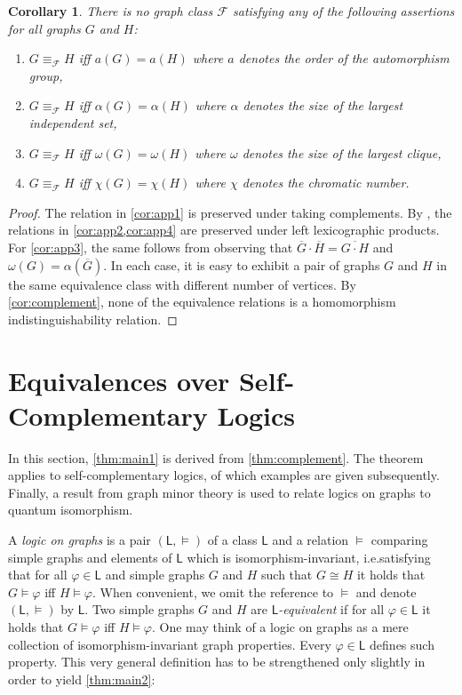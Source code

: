\documentclass[3p,final]{elsarticle}
\renewcommand\phi\varphi
\newtheorem{corollary}[theorem]{Corollary}
\begin{document}
	\begin{corollary} \label{cor:no-hom}
		There is no graph class $\mathcal{F}$ satisfying any of the following assertions for all graphs $G$ and $H$:
		\begin{enumerate}
			\item $G \equiv_{\mathcal{F}} H$ iff $a(G) = a(H)$ where $a$ denotes the order of the automorphism group,\label{cor:app1}
			\item $G \equiv_{\mathcal{F}} H$ iff $\alpha(G) = \alpha(H)$ where $\alpha$ denotes the size of the largest independent set,\label{cor:app2}
			\item $G \equiv_{\mathcal{F}} H$ iff $\omega(G) = \omega(H)$ where $\omega$ denotes the size of the largest clique,\label{cor:app3}
			\item $G \equiv_{\mathcal{F}} H$ iff $\chi(G) = \chi(H)$ where $\chi$ denotes the chromatic number.\label{cor:app4}
		\end{enumerate}
	\end{corollary}
	\begin{proof}
		The relation in \cref{cor:app1} is preserved under taking complements. By \cite[Theorem~1, Corollary p.\@~90]{geller_chromatic_1975}, the relations in \cref{cor:app2,cor:app4} are preserved under left lexicographic products. For \cref{cor:app3}, the same follows from \cite[Theorem~1]{geller_chromatic_1975} observing that $\overline{G} \cdot \overline{H} = \overline{G \cdot H}$ and $\omega(G) = \alpha(\overline{G})$.
		In each case, it is easy to exhibit a pair of graphs $G$ and $H$ in the same equivalence class with different number of vertices. By \cref{cor:complement}, none of the equivalence relations is a homomorphism indistinguishability relation.
	\end{proof}
	
	\section{Equivalences over Self-Complementary Logics}
	\label{sec:logic}
	
	In this section, \cref{thm:main1} is derived from \cref{thm:complement}.
	The theorem applies to self-complementary logics, of which examples are given subsequently.
	Finally, a result from graph minor theory is used to relate logics on graphs to quantum isomorphism.
	
	A \emph{logic on graphs} \cite{barwise_extended_2017} is a  pair $(\mathsf{L}, \models)$ of a class $\mathsf{L}$ and a relation $\models$ comparing simple graphs and elements of $\mathsf{L}$ which is isomorphism-invariant, i.e.\@ satisfying that for all $\phi \in \mathsf{L}$ and simple graphs $G$ and $H$ such that $G \cong H$ it holds that $G \models \phi$ iff $H \models \phi$.
	When convenient, we omit the reference to $\models$ and denote $(\mathsf{L}, \models)$ by $\mathsf{L}$.
	Two simple graphs $G$ and $H$ are \emph{$\mathsf{L}$-equivalent} if for all $\phi \in \mathsf{L}$ it holds that $G \models \phi$ iff $H \models \phi$.
	One may think of a logic on graphs as a mere collection of isomorphism-invariant graph properties. Every $\phi \in \mathsf{L}$ defines such property.
	This very general definition has to be strengthened only slightly in order to yield \cref{thm:main2}:
	
\end{document}
